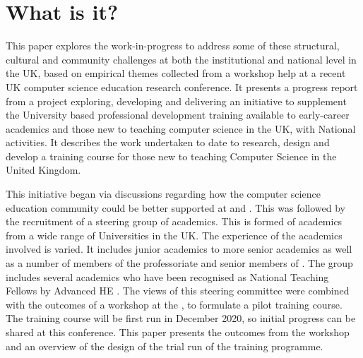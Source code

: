 \documentclass[sigconf]{acmart}
\begin{document}


\maketitle

\section{What is it?}	
This paper explores the work-in-progress to address some of these structural, cultural and community challenges at both the institutional and national level in the UK, based on empirical themes collected from a workshop help at a recent UK computer science education research conference. It presents a progress report from a project exploring, developing and delivering an initiative to supplement the University based professional development training available to early-career academics and those new to teaching computer science in the UK, with National activities. It describes the work undertaken to date to research, design and develop a training course for those new to teaching Computer Science in the United Kingdom. 

This initiative began via discussions regarding how the computer science education community could be better supported at   and  . This was followed by the recruitment of a steering group of academics. This is formed of academics from a wide range of Universities in the UK. The experience of the academics involved is varied. It includes junior academics to more senior academics as well as a number of members of the professoriate and senior members of . The group includes several academics who have been recognised as National Teaching Fellows by Advanced HE \cite{AdvancedHENTF}. The views of this steering committee were combined with the outcomes of a workshop at the  , to formulate a pilot training course. The training course will be first run in December 2020, so initial progress can be shared at this conference. This paper presents the outcomes from the workshop and an overview of the design of the trial run of the training programme.
\end{document}
